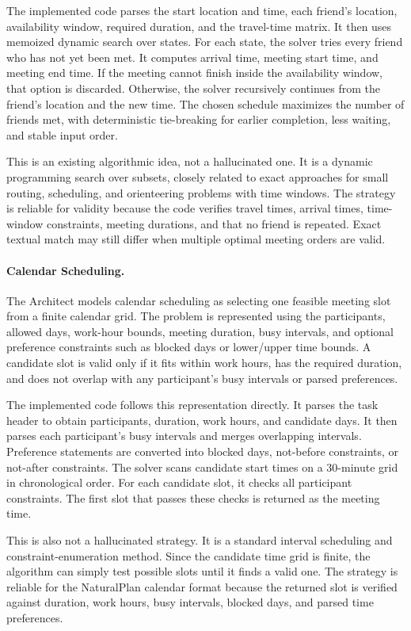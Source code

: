 The implemented code parses the start location and time, each friend's
location, availability window, required duration, and the travel-time matrix.
It then uses memoized dynamic search over states.  For each state, the solver
tries every friend who has not yet been met.  It computes arrival time,
meeting start time, and meeting end time.  If the meeting cannot finish inside
the availability window, that option is discarded.  Otherwise, the solver
recursively continues from the friend's location and the new time.  The chosen
schedule maximizes the number of friends met, with deterministic tie-breaking
for earlier completion, less waiting, and stable input order.

This is an existing algorithmic idea, not a hallucinated one.  It is a dynamic
programming search over subsets, closely related to exact approaches for
small routing, scheduling, and orienteering problems with time windows.  The
strategy is reliable for validity because the code verifies travel times,
arrival times, time-window constraints, meeting durations, and that no friend
is repeated.  Exact textual match may still differ when multiple optimal
meeting orders are valid.

\paragraph{Calendar Scheduling.}
The Architect models calendar scheduling as selecting one feasible meeting
slot from a finite calendar grid.  The problem is represented using the
participants, allowed days, work-hour bounds, meeting duration, busy intervals,
and optional preference constraints such as blocked days or lower/upper time
bounds.  A candidate slot is valid only if it fits within work hours, has the
required duration, and does not overlap with any participant's busy intervals
or parsed preferences.

The implemented code follows this representation directly.  It parses the
task header to obtain participants, duration, work hours, and candidate days.
It then parses each participant's busy intervals and merges overlapping
intervals.  Preference statements are converted into blocked days,
not-before constraints, or not-after constraints.  The solver scans candidate
start times on a 30-minute grid in chronological order.  For each candidate
slot, it checks all participant constraints.  The first slot that passes these
checks is returned as the meeting time.

This is also not a hallucinated strategy.  It is a standard interval
scheduling and constraint-enumeration method.  Since the candidate time grid
is finite, the algorithm can simply test possible slots until it finds a
valid one.  The strategy is reliable for the NaturalPlan calendar format
because the returned slot is verified against duration, work hours, busy
intervals, blocked days, and parsed time preferences.

